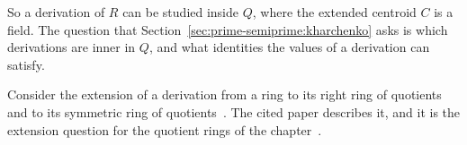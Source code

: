 So a derivation of $R$ can be studied inside $Q$, where the extended centroid
$C$ is a field. The question that Section~\ref{sec:prime-semiprime:kharchenko}
asks is which derivations are inner in $Q$, and what identities the values of
a derivation can satisfy.

Consider the extension of a derivation from a ring to its right ring of
quotients and to its symmetric ring of quotients~\cite{WlExtendingRingDerivationsToRigh2020}. The cited paper
describes it, and it is the extension question for the quotient rings of
the chapter~\cite{WlExtendingRingDerivationsToRigh2020}.
